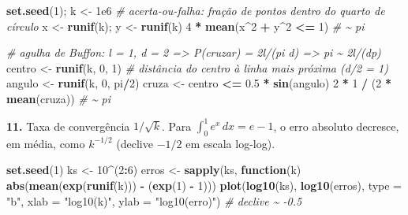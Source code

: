 \documentclass[
  portuguese,
  11pt,
  openany]{book}
\newenvironment{Shaded}{\begin{snugshade}}{\end{snugshade}}
\newcommand{\AttributeTok}[1]{\textcolor[rgb]{0.13,0.29,0.53}{#1}}
\newcommand{\CommentTok}[1]{\textcolor[rgb]{0.56,0.35,0.01}{\textit{#1}}}
\newcommand{\ControlFlowTok}[1]{\textcolor[rgb]{0.13,0.29,0.53}{\textbf{#1}}}
\newcommand{\DecValTok}[1]{\textcolor[rgb]{0.00,0.00,0.81}{#1}}
\newcommand{\FloatTok}[1]{\textcolor[rgb]{0.00,0.00,0.81}{#1}}
\newcommand{\FunctionTok}[1]{\textcolor[rgb]{0.13,0.29,0.53}{\textbf{#1}}}
\newcommand{\NormalTok}[1]{#1}
\newcommand{\OtherTok}[1]{\textcolor[rgb]{0.56,0.35,0.01}{#1}}
\newcommand{\SpecialCharTok}[1]{\textcolor[rgb]{0.81,0.36,0.00}{\textbf{#1}}}
\newcommand{\StringTok}[1]{\textcolor[rgb]{0.31,0.60,0.02}{#1}}
\begin{document}
\begin{Shaded}
\begin{Highlighting}[]
\FunctionTok{set.seed}\NormalTok{(}\DecValTok{1}\NormalTok{); k }\OtherTok{\textless{}{-}} \FloatTok{1e6}
\CommentTok{\# acerta{-}ou{-}falha: fração de pontos dentro do quarto de círculo}
\NormalTok{x }\OtherTok{\textless{}{-}} \FunctionTok{runif}\NormalTok{(k); y }\OtherTok{\textless{}{-}} \FunctionTok{runif}\NormalTok{(k)}
\DecValTok{4} \SpecialCharTok{*} \FunctionTok{mean}\NormalTok{(x}\SpecialCharTok{\^{}}\DecValTok{2} \SpecialCharTok{+}\NormalTok{ y}\SpecialCharTok{\^{}}\DecValTok{2} \SpecialCharTok{\textless{}=} \DecValTok{1}\NormalTok{)             }\CommentTok{\# \textasciitilde{} pi}

\CommentTok{\# agulha de Buffon: l = 1, d = 2  =\textgreater{}  P(cruzar) = 2l/(pi d)  =\textgreater{}  pi \textasciitilde{} 2l/(dp)}
\NormalTok{centro }\OtherTok{\textless{}{-}} \FunctionTok{runif}\NormalTok{(k, }\DecValTok{0}\NormalTok{, }\DecValTok{1}\NormalTok{)             }\CommentTok{\# distância do centro à linha mais próxima (d/2 = 1)}
\NormalTok{angulo }\OtherTok{\textless{}{-}} \FunctionTok{runif}\NormalTok{(k, }\DecValTok{0}\NormalTok{, pi}\SpecialCharTok{/}\DecValTok{2}\NormalTok{)}
\NormalTok{cruza  }\OtherTok{\textless{}{-}}\NormalTok{ centro }\SpecialCharTok{\textless{}=} \FloatTok{0.5} \SpecialCharTok{*} \FunctionTok{sin}\NormalTok{(angulo)}
\DecValTok{2} \SpecialCharTok{*} \DecValTok{1} \SpecialCharTok{/}\NormalTok{ (}\DecValTok{2} \SpecialCharTok{*} \FunctionTok{mean}\NormalTok{(cruza))            }\CommentTok{\# \textasciitilde{} pi}
\end{Highlighting}
\end{Shaded}

\textbf{11.} Taxa de convergência \(1/\sqrt{k}\). Para \(\int_0^1 e^x\,dx = e - 1\), o erro
absoluto decresce, em média, como \(k^{-1/2}\) (declive \(-1/2\) em escala log-log).

\begin{Shaded}
\begin{Highlighting}[]
\FunctionTok{set.seed}\NormalTok{(}\DecValTok{1}\NormalTok{)}
\NormalTok{ks }\OtherTok{\textless{}{-}} \DecValTok{10}\SpecialCharTok{\^{}}\NormalTok{(}\DecValTok{2}\SpecialCharTok{:}\DecValTok{6}\NormalTok{)}
\NormalTok{erros }\OtherTok{\textless{}{-}} \FunctionTok{sapply}\NormalTok{(ks, }\ControlFlowTok{function}\NormalTok{(k) }\FunctionTok{abs}\NormalTok{(}\FunctionTok{mean}\NormalTok{(}\FunctionTok{exp}\NormalTok{(}\FunctionTok{runif}\NormalTok{(k))) }\SpecialCharTok{{-}}\NormalTok{ (}\FunctionTok{exp}\NormalTok{(}\DecValTok{1}\NormalTok{) }\SpecialCharTok{{-}} \DecValTok{1}\NormalTok{)))}
\FunctionTok{plot}\NormalTok{(}\FunctionTok{log10}\NormalTok{(ks), }\FunctionTok{log10}\NormalTok{(erros), }\AttributeTok{type =} \StringTok{"b"}\NormalTok{,}
     \AttributeTok{xlab =} \StringTok{"log10(k)"}\NormalTok{, }\AttributeTok{ylab =} \StringTok{"log10(erro)"}\NormalTok{)   }\CommentTok{\# declive \textasciitilde{} {-}0.5}
\end{Highlighting}
\end{Shaded}
\end{document}
